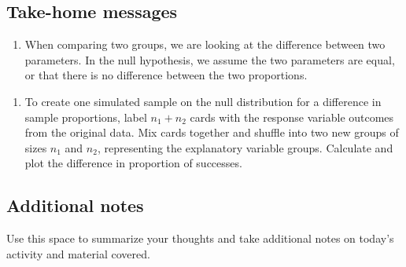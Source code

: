 \documentclass[
]{report}
\providecommand{\tightlist}{%
  \setlength{\itemsep}{0pt}\setlength{\parskip}{0pt}}
\begin{document}
\vspace{1in}

\subsection{Take-home messages}\label{take-home-messages-2}

\begin{enumerate}
\def\labelenumi{\arabic{enumi}.}
\tightlist
\item
  When comparing two groups, we are looking at the difference between two parameters. In the null hypothesis, we assume the two parameters are equal, or that there is no difference between the two proportions.
\end{enumerate}

\begin{enumerate}
\def\labelenumi{\arabic{enumi}.}
\setcounter{enumi}{1}
\tightlist
\item
  To create one simulated sample on the null distribution for a difference in sample proportions, label \(n_1 + n_2\) cards with the response variable outcomes from the original data. Mix cards together and shuffle into two new groups of sizes \(n_1\) and \(n_2\), representing the explanatory variable groups. Calculate and plot the difference in proportion of successes.
\end{enumerate}

\subsection{Additional notes}\label{additional-notes-2}

Use this space to summarize your thoughts and take additional notes on today's activity and material covered.

\newpage
\end{document}
